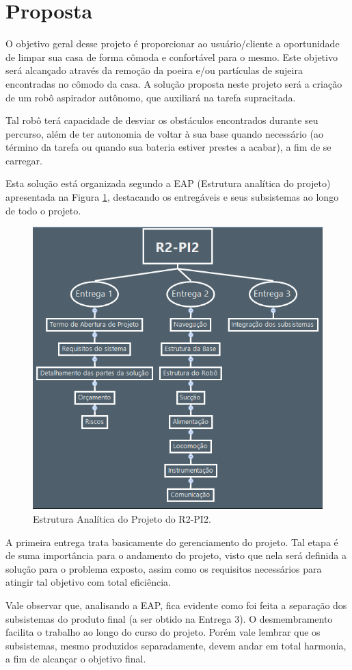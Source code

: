 \section{Proposta} %
\label{sub:proposta}
	
	O objetivo geral desse projeto é proporcionar ao usuário/cliente a oportunidade de limpar sua casa de forma cômoda e confortável para o mesmo. Este objetivo será alcançado através da remoção da poeira e/ou partículas de sujeira encontradas no cômodo da casa. A solução proposta neste projeto será a criação de um robô aspirador autônomo, que auxiliará na tarefa supracitada. 

	Tal robô terá capacidade de desviar os obstáculos encontrados durante seu percurso, além de ter autonomia de voltar à sua base quando necessário (ao término da tarefa ou quando sua bateria estiver prestes a acabar), a fim de se carregar.

	Esta solução está organizada segundo a EAP (Estrutura analítica do projeto) apresentada na Figura \ref{img:eap}, destacando os entregáveis e seus subsistemas ao longo de todo o projeto.
	
	\begin{figure}[H]
		\centering
		\includegraphics[scale=0.55]{figuras/eap.png}
		\caption{Estrutura Analítica do Projeto do R2-PI2.}
		\label{img:eap}
	\end{figure}

	A primeira entrega trata basicamente do gerenciamento do projeto. Tal etapa é de suma importância para o andamento do projeto, visto que nela será definida a solução para o problema exposto, assim como os requisitos necessários para atingir tal objetivo com total eficiência.

	Vale observar que, analisando a EAP, fica evidente como foi feita a separação dos subsistemas do produto final (a ser obtido na Entrega 3). O desmembramento facilita o trabalho ao longo do curso do projeto. Porém vale lembrar que os subsistemas, mesmo produzidos separadamente, devem  andar em total harmonia, a fim de alcançar o objetivo final.
